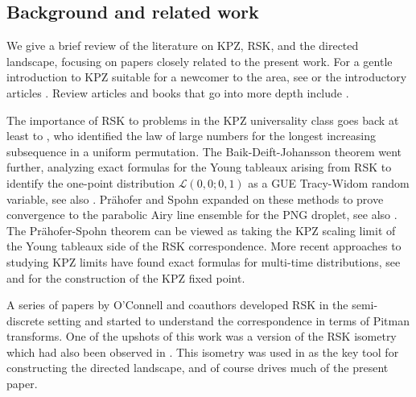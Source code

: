 \documentclass[11pt]{article}
\newcommand{\cL}{\mathcal{L}}
\theoremstyle{definition} %
\theoremstyle{remark} %
\begin{document}
\subsection{Background and related work}
\label{S:background}

We give a brief review of the literature on KPZ, RSK, and the directed landscape, focusing on papers closely related to the present work. For a gentle introduction to KPZ suitable for a newcomer to the area, see \cite{romik2015surprising} or the introductory articles \cite{corwin2016kardar, ganguly2021random}. Review articles and books that go into more depth include \cite{ferrari2010random, quastel2011introduction,weiss2017reflected, zygouras2018some}.

The importance of RSK to problems in the KPZ universality class goes back at least to \cite{logan1977variational, vershik1977asymptotics}, who identified the law of large numbers for the longest increasing subsequence in a uniform permutation. The Baik-Deift-Johansson theorem \cite{baik1999distribution} went further, analyzing exact formulas for the Young tableaux arising from RSK to identify the one-point distribution $\cL(0,0; 0, 1)$ as a GUE Tracy-Widom random variable, see also \cite{johansson2000shape}. Pr\"ahofer and Spohn expanded on these methods \cite{prahofer2002scale} to prove convergence to the parabolic Airy line ensemble for the PNG droplet, see also \cite{johansson2003discrete}. The Pr\"ahofer-Spohn theorem can be viewed as taking the KPZ scaling limit of the Young tableaux side of the RSK correspondence. More recent approaches to studying KPZ limits have found exact formulas for multi-time distributions, see \cite{johansson2019multi, baik2017multi} and \cite{matetski2016kpz} for the construction of the KPZ fixed point.

A series of papers by O'Connell and coauthors \cite{o2001brownian, o2002representation, o2003path, biane2005littelmann} developed RSK in the semi-discrete setting and started to understand the correspondence in terms of Pitman transforms. One of the upshots of this work was a version of the RSK isometry which had also been observed in \cite{noumi2002tropical}. This isometry was used in \cite{DOV} as the key tool for constructing the directed landscape, and of course drives much of the present paper.
\end{document}
